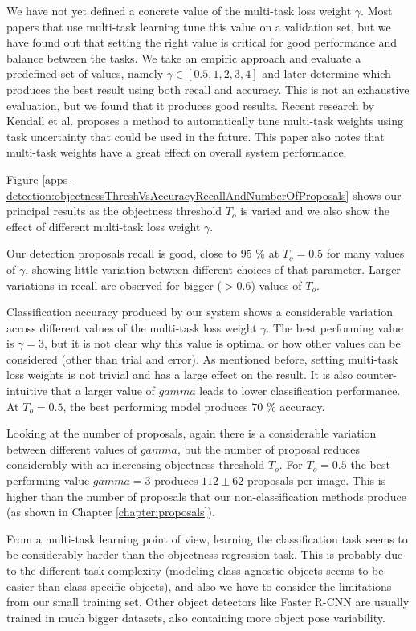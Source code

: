 We have not yet defined a concrete value of the multi-task loss weight $\gamma$. Most papers that use multi-task learning tune this value on a validation set, but we have found out that setting the right value is critical for good performance and balance between the tasks. We take an empiric approach and evaluate a predefined set of values, namely $\gamma \in [0.5, 1, 2, 3, 4]$ and later determine which produces the best result using both recall and accuracy. This is not an exhaustive evaluation, but we found that it produces good results. Recent research by Kendall et al. \cite[-6em]{kendall2017multi} proposes a method to automatically tune multi-task weights using task uncertainty that could be used in the future. This paper also notes that multi-task weights have a great effect on overall system performance.

Figure \ref{apps-detection:objectnessThreshVsAccuracyRecallAndNumberOfProposals} shows our principal results as the objectness threshold $T_o$ is varied and we also show the effect of different multi-task loss weight $\gamma$.

Our detection proposals recall is good, close to $95$ \% at $T_o = 0.5$ for many values of $\gamma$, showing little variation between different choices of that parameter. Larger variations in recall are observed for bigger ($> 0.6$) values of $T_o$.

Classification accuracy produced by our system shows a considerable variation across different values of the multi-task loss weight $\gamma$. The best performing value is $\gamma = 3$, but it is not clear why this value is optimal or how other values can be considered (other than trial and error). As mentioned before, setting multi-task loss weights is not trivial and has a large effect on the result. It is also counter-intuitive that a larger value of $gamma$ leads to lower classification performance. At $T_o = 0.5$, the best performing model produces $70$ \% accuracy.

Looking at the number of proposals, again there is a considerable variation between different values of $gamma$, but the number of proposal reduces considerably with an increasing objectness threshold $T_o$. For $T_o = 0.5$ the best performing value $gamma = 3$ produces $112 \pm 62$ proposals per image. This is higher than the number of proposals that our non-classification methods produce (as shown in Chapter \ref{chapter:proposals}).

From a multi-task learning point of view, learning the classification task seems to be considerably harder than the objectness regression task. This is probably due to the different task complexity (modeling class-agnostic objects seems to be easier than class-specific objects), and also we have to consider the limitations from our small training set. Other object detectors like Faster R-CNN are usually trained in much bigger datasets, also containing more object pose variability.

